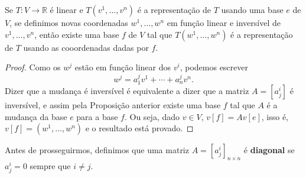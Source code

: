 \begin{corollary}
    Se $T \colon V \to \mathbb{R}$ é linear e $T(v^1, \dots, v^n)$ é a representação de $T$ usando uma base $e$ de $V$, se definimos novas coordenadas $w^1, \dots, w^n$ em função linear e inversível de $v^1, \dots, v^n$, então existe uma base $f$ de $V$ tal que $T(w^1, \dots, w^n)$ é a representação de $T$ usando as cooordenadas dadas por $f$.
\end{corollary}
\begin{proof}
    Como os $w^j$ estão em função linear dos $v^i$, podemos escrever \begin{equation}
        w^j = a^j_1 v^1 + \cdots + a^j_n v^n.
    \end{equation} Dizer que a mudança é inversível é equivalente a dizer que a matriz $A = [a^i_j]$ é inversível, e assim pela Proposição anterior existe uma base $f$ tal que $A$ é a mudança da base $e$ para a base $f$. Ou seja, dado $v \in V$, $v[f] = Av[e]$, isso é, $v[f] = (w^1, \dots, w^n)$ e o resultado está provado.
\end{proof}

Antes de prosseguirmos, definimos que uma matriz $A = [a^i_j]_{n \times n}$ é \textbf{diagonal} se $a^i_j = 0$ sempre que $i \neq j$.

